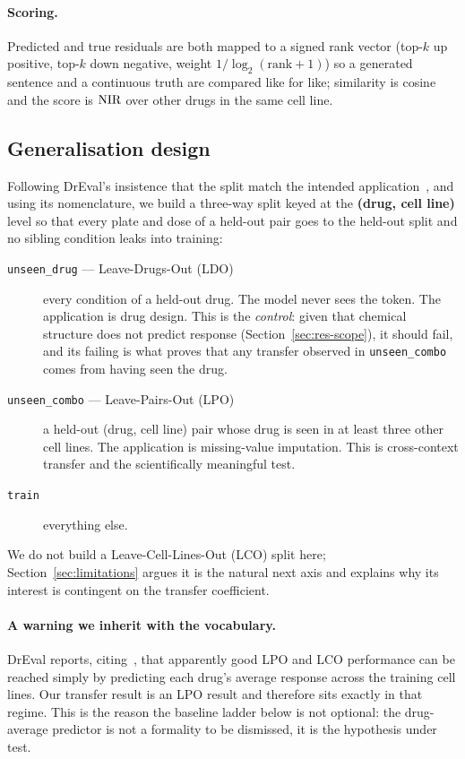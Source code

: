 \paragraph{Scoring.} Predicted and true residuals are both mapped to a signed rank vector (top-$k$
up positive, top-$k$ down negative, weight $1/\log_2(\textrm{rank}+1)$) so a generated sentence and
a continuous truth are compared like for like; similarity is cosine and the score is $\textrm{NIR}$ over
other drugs in the same cell line.

\subsection{Generalisation design}
\label{sec:methods-holdout}

Following DrEval's insistence that the split match the intended
application~\cite{dreval}, and using its nomenclature, we build a three-way split keyed at the
\textbf{(drug, cell line)} level so that every plate and dose of a held-out pair goes to the held-out
split and no sibling condition leaks into training:
\begin{description}
  \item[\texttt{unseen\_drug} --- Leave-Drugs-Out (LDO)] every condition of a held-out drug. The
        model never sees the token. The application is drug design. This is the \emph{control}:
        given that chemical structure does not predict response (Section~\ref{sec:res-scope}), it
        should fail, and its failing is what proves that any transfer observed in
        \texttt{unseen\_combo} comes from having seen the drug.
  \item[\texttt{unseen\_combo} --- Leave-Pairs-Out (LPO)] a held-out (drug, cell line) pair whose
        drug is seen in at least three other cell lines. The application is missing-value
        imputation. This is cross-context transfer and the scientifically meaningful test.
  \item[\texttt{train}] everything else.
\end{description}

We do not build a Leave-Cell-Lines-Out (LCO) split here; Section~\ref{sec:limitations} argues it is
the natural next axis and explains why its interest is contingent on the transfer coefficient.

\paragraph{A warning we inherit with the vocabulary.} DrEval reports, citing~\cite{partin}, that
apparently good LPO and LCO performance can be reached simply by predicting each drug's average
response across the training cell lines. Our transfer result is an LPO result and therefore sits
exactly in that regime. This is the reason the baseline ladder below is not optional: the
drug-average predictor is not a formality to be dismissed, it is the hypothesis under test.

